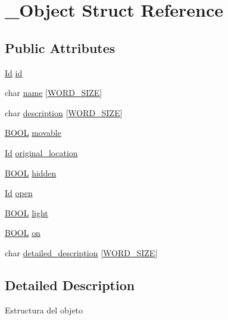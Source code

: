 \hypertarget{struct__Object}{}\section{\+\_\+\+Object Struct Reference}
\label{struct__Object}
\subsection*{Public Attributes}
\begin{DoxyCompactItemize}
\item 
\hyperlink{types_8h_a845e604fb28f7e3d97549da3448149d3}{Id} \hyperlink{struct__Object_a3cff7a0e8dc4e9d23895ed9af1b7653a}{id}
\item 
char \hyperlink{struct__Object_a3dab853826b88558a2c07dec50b96d57}{name} \mbox{[}\hyperlink{types_8h_a92ed8507d1cd2331ad09275c5c4c1c89}{W\+O\+R\+D\+\_\+\+S\+I\+ZE}\mbox{]}
\item 
char \hyperlink{struct__Object_a556e2e37c1461bcaae6492d2101f407d}{description} \mbox{[}\hyperlink{types_8h_a92ed8507d1cd2331ad09275c5c4c1c89}{W\+O\+R\+D\+\_\+\+S\+I\+ZE}\mbox{]}
\item 
\hyperlink{types_8h_a3e5b8192e7d9ffaf3542f1210aec18dd}{B\+O\+OL} \hyperlink{struct__Object_ae013850f78da07c39e530f36bf98f2b9}{movable}
\item 
\hyperlink{types_8h_a845e604fb28f7e3d97549da3448149d3}{Id} \hyperlink{struct__Object_a70df2bf7a3fa2b9b20bd3a20afb2ac26}{original\+\_\+location}
\item 
\hyperlink{types_8h_a3e5b8192e7d9ffaf3542f1210aec18dd}{B\+O\+OL} \hyperlink{struct__Object_a44824966fc9f4d5f82c189b2e063ddc4}{hidden}
\item 
\hyperlink{types_8h_a845e604fb28f7e3d97549da3448149d3}{Id} \hyperlink{struct__Object_a0922dd9891e6aa617ce1d51ae27c0175}{open}
\item 
\hyperlink{types_8h_a3e5b8192e7d9ffaf3542f1210aec18dd}{B\+O\+OL} \hyperlink{struct__Object_a213da2eaffd083a65a4109f96be560b4}{light}
\item 
\hyperlink{types_8h_a3e5b8192e7d9ffaf3542f1210aec18dd}{B\+O\+OL} \hyperlink{struct__Object_a325dedec5324e588d2a86e7ffa478350}{on}
\item 
char \hyperlink{struct__Object_a845f937720e152021135cb3ddbd21b05}{detailed\+\_\+description} \mbox{[}\hyperlink{types_8h_a92ed8507d1cd2331ad09275c5c4c1c89}{W\+O\+R\+D\+\_\+\+S\+I\+ZE}\mbox{]}
\end{DoxyCompactItemize}


\subsection{Detailed Description}
Estructura del objeto 

